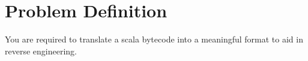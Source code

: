 \chapter{Problem Definition}

You are required to translate a scala bytecode into a meaningful format to aid in reverse engineering. \\